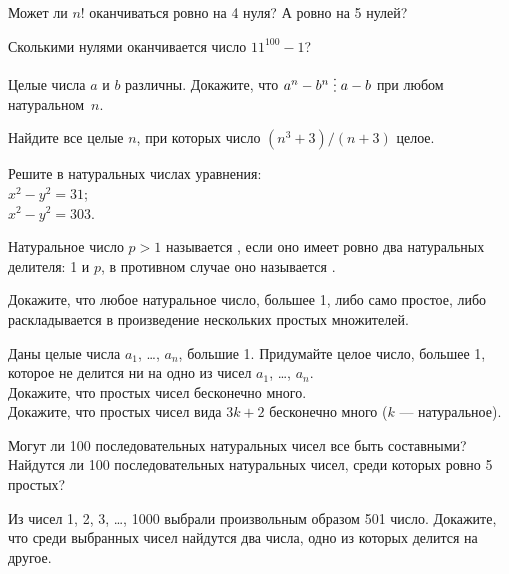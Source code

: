 \documentclass[a4paper,12pt]{article}
\newcommand{\del}{\mathrel{\raisebox{-.3 ex}{${\vdots}$}}}
\begin{document}



Может ли $n!$ оканчиваться ровно на 4 нуля? А ровно на 5 нулей?

Сколькими нулями оканчивается число $11^{100}-1$?

Целые числа $a$ и $b$ различны. Докажите, что $a^n-b^n\del a-b$
при любом натуральном~$n$.

Найдите все целые $n$, при которых число $(n^3+3)/(n+3)$ целое.

Решите в натуральных числах уравнения:\\
$x^2-y^2=31$;\\
$x^2-y^2=303$.


Натуральное число $p>1$ называется , если оно имеет ровно два
натуральных делителя: 1 и $p$, в противном случае оно
называется .

 Докажите, что любое натуральное число, большее 1,
либо само простое, либо раскладывается в произведение нескольких
простых множителей.


Даны целые числа $a_1$, \ldots, $a_n$, большие 1.
Придумайте целое число, большее 1, которое не делится ни на одно из чисел
$a_1$, \ldots, $a_n$.\\
 Докажите, что простых чисел бесконечно много.\\
 Докажите, что простых чисел вида $3k+2$ бесконечно много
($k$ --- натуральное).

Могут ли 100 последовательных натуральных чисел
все быть составными?\\
Найдутся ли 100 последовательных натуральных чисел,
среди которых ровно 5 простых?


Из чисел 1, 2, 3, \dots , 1000 выбрали произвольным образом 501 число.
Докажите, что среди выбранных чисел найдутся два числа, одно из которых
делится на другое.



\end{document}
